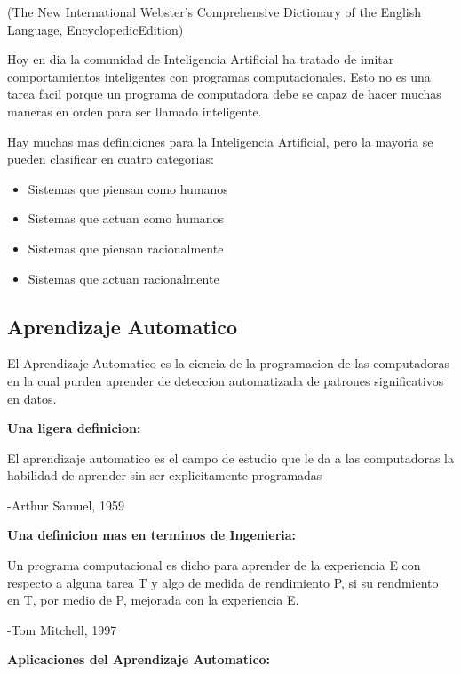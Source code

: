 (The New International Webster’s Comprehensive Dictionary of the English Language, EncyclopedicEdition) 

Hoy en dia la comunidad de Inteligencia Artificial ha tratado de imitar comportamientos inteligentes con programas computacionales. Esto no es una tarea facil porque un programa de computadora debe se capaz de hacer muchas maneras en orden para ser llamado inteligente.

Hay muchas mas definiciones para la Inteligencia Artificial, pero la mayoria se pueden clasificar en cuatro categorias:

\begin{itemize}
    \item Sistemas que piensan como humanos
    
    \item Sistemas que actuan como humanos
    
    \item Sistemas que piensan racionalmente
    
    \item Sistemas que actuan racionalmente
\end{itemize}


\subsection{Aprendizaje Automatico}
El Aprendizaje Automatico es la ciencia de la programacion de las computadoras en la cual purden aprender de deteccion automatizada de patrones significativos en datos.

\textbf{Una ligera definicion:}

El aprendizaje automatico es el campo de estudio que le da a las computadoras la habilidad de aprender sin ser explicitamente programadas

-Arthur Samuel, 1959

\textbf{Una definicion mas en terminos de Ingenieria:}

Un programa computacional es dicho para aprender de la experiencia E con respecto a alguna tarea T y algo de medida de rendimiento P, si su rendmiento en T, por medio de P, mejorada con la experiencia E.

-Tom Mitchell, 1997

\textbf{Aplicaciones del Aprendizaje Automatico: }

